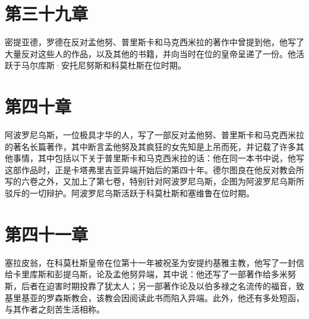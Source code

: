 
\section{第三十九章}

密提亚德，罗德在反对孟他努、普里斯卡和马克西米拉的著作中曾提到他，他写了大量反对这些人的作品，以及其他的书籍，并向当时在位的皇帝呈递了一份。他活跃于马尔库斯·安托尼努斯和科莫杜斯在位时期。\par


\section{第四十章}

阿波罗尼乌斯，一位极具才华的人，写了一部反对孟他努、普里斯卡和马克西米拉的著名长篇著作，其中断言孟他努及其疯狂的女先知是上吊而死，并记载了许多其他事情，其中包括以下关于普里斯卡和马克西米拉的话：他在同一本书中说，他写这部作品时，正是卡塔弗里吉亚异端开始后的第四十年。德尔图良在他反对教会所写的六卷之外，又加上了第七卷，特别针对阿波罗尼乌斯，企图为阿波罗尼乌斯所驳斥的一切辩护。阿波罗尼乌斯活跃于科莫杜斯和塞维鲁在位时期。\par


\section{第四十一章}

塞拉皮翁，在科莫杜斯皇帝在位第十一年被祝圣为安提约基雅主教，他写了一封信给卡里库斯和彭提乌斯，论及孟他努异端，其中说：他还写了一部著作给多米努斯，后者在迫害时期投靠了犹太人；另一部著作论及以伯多禄之名流传的福音，致基里基亚的罗森斯教会，该教会因阅读此书而陷入异端。此外，他还有多处短函，与其作者之刻苦生活相称。\par

